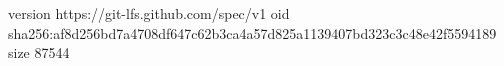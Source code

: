 version https://git-lfs.github.com/spec/v1
oid sha256:af8d256bd7a4708df647c62b3ca4a57d825a1139407bd323c3c48e42f5594189
size 87544
